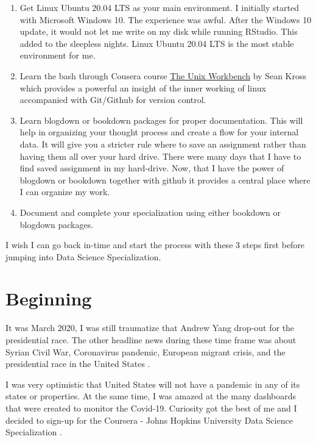 \documentclass[
]{book}
\providecommand{\tightlist}{%
  \setlength{\itemsep}{0pt}\setlength{\parskip}{0pt}}
\begin{document}
\begin{enumerate}
\def\labelenumi{\arabic{enumi}.}
\tightlist
\item
  Get Linux Ubuntu 20.04 LTS as your main environment. I initially started with Microsoft Windows 10. The experience was awful. After the Windows 10 update, it would not let me write on my disk while running RStudio. This added to the sleepless nights. Linux Ubuntu 20.04 LTS is the most stable environment for me.\\
\item
  Learn the bash through Cousera course \href{https://www.coursera.org/learn/unix\#about}{The Unix Workbench} by Sean Kross which provides a powerful an insight of the inner working of linux accompanied with Git/Github for version control.
\item
  Learn blogdown or bookdown packages for proper documentation. This will help in organizing your thought process and create a flow for your internal data. It will give you a stricter rule where to save an assignment rather than having them all over your hard drive. There were many days that I have to find saved assignment in my hard-drive. Now, that I have the power of blogdown or bookdown together with github it provides a central place where I can organize my work.\\
\item
  Document and complete your specialization using either bookdown or blogdown packages.
\end{enumerate}

I wish I can go back in-time and start the process with these 3 steps first before jumping into Data Science Specialization.

\hypertarget{intro}{%
\chapter{Beginning}\label{intro}}

It was March 2020, I was still traumatize that Andrew Yang drop-out for the presidential race. The other headline news during these time frame was about Syrian Civil War, Coronavirus pandemic, European migrant crisis, and the presidential race in the United States \citep{headline}.

I was very optimistic that United States will not have a pandemic in any of its states or properties. At the same time, I was amazed at the many dashboards that were created to monitor the Covid-19. Curiosity got the best of me and I decided to sign-up for the Coursera - Johns Hopkins University Data Science Specialization \citep{dss}.
\end{document}
